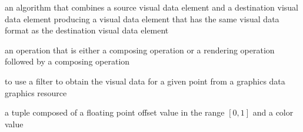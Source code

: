 an algorithm that combines a source visual data element and a destination visual data element producing a visual data element that has the same visual data format as the destination visual data element

an operation that is either a composing operation or a rendering operation followed by a composing operation

to use a filter to obtain the visual data for a given point from a graphics data graphics resource

a tuple composed of a floating point offset value in the range $[0, 1]$ and a color value



%
%

